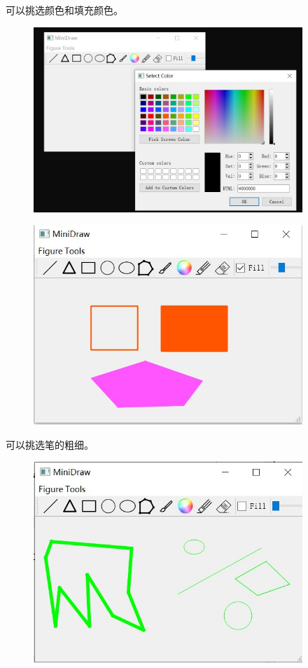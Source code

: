 \documentclass{article}
\begin{document}
	可以挑选颜色和填充颜色。
	\begin{figure}[htb]
		\begin{center}
			\includegraphics[width=4in]{colorui.jpg}
		\end{center}
	\end{figure}\clearpage
	\begin{figure}[htb]
		\begin{center}
			\includegraphics[width=4in]{color.jpg}
		\end{center}
	\end{figure}

	可以挑选笔的粗细。
	\begin{figure}[htb]
		\begin{center}
			\includegraphics[width=4in]{thick.jpg}
		\end{center}
	\end{figure}
	
\end{document}
